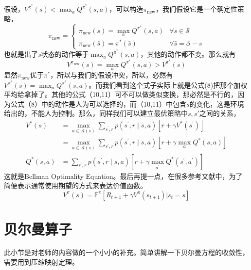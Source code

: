 \documentclass[a4paper]{article}
\begin{document}
假设，$V^{\pi^\ast}(s) < \max_a Q^{\pi^\ast}(s,a)$，可以构造$\pi_{\text{new}}$，我们假设它是一个确定性策略，
\begin{equation}
    \pi_{\text{new}} =
    \left\{
    \begin{array}{ll}
        \pi_{\text{new}}(s) = \max_a Q^{\pi^\ast}(s,a) & \forall s\in \mathcal{S}  \\
        \pi_{\text{new}}(\bar{s}) = \pi^\ast(\bar{s}) & \forall \bar{s} = \mathcal{S} - s
    \end{array}
    \right.
\end{equation}
也就是出了$s$状态的动作等于$\max_a Q^{\pi^\ast}(s,a)$，其他的动作都不变。那么就有
\begin{equation}
    V^{\pi_{\text{new}}}(s) = \max_a Q^{\pi^\ast}(s,a) > V^{\pi^\ast}(s)
\end{equation}
显然$\pi_{\text{new}}$优于$\pi^\ast$，所以与我们的假设冲突，所以，必然有$V^{\pi^\ast}(s) = \max_a Q^{\pi^\ast}(s,a)$。而我们看到这个式子实际上就是公式(8)把那个加权平均给拿掉了。其他的公式（10,11）可不可以做类似变换，那必然是不行的，因为公式（8）中的动作是人为可以选择的，而（10,11）中包含$s$的变化，这是环境给出的，不能人为控制。那么，同样我们可以建立最优策略中$s,s'$之间的关系，
\begin{equation}\begin{aligned}
V^{*}(s) &=\max _{a \in \mathcal{A}(s)} \sum_{s^{\prime}, r} p\left(s^{\prime}, r \mid s, a\right)\left[r+\gamma V^{*}\left(s^{\prime}\right)\right] \\
& = \max _{a \in \mathcal{A}(s)} \sum_{s^{\prime}, r} p\left(s^{\prime}, r \mid s, a\right)\left[r+\gamma \max_a Q^\ast(s,a)\right] \\
Q^{*}(s, a) &=\sum_{s^{\prime}, r} p\left(s^{\prime}, r \mid s, a\right)\left[r+\gamma \max _{a^{\prime}} Q^{*}\left(s^{\prime}, a^{\prime}\right)\right]
\end{aligned}\end{equation}
这就是Bellman Optimality Equation。最后再提一点，在很多参考文献中，为了简便表示通常使用期望的方式来表达价值函数。
\begin{equation}
    V^\pi(s) = \mathbb{E}^\pi\left[R_{t+1} + \gamma V^\pi(s_{t+1})|s_t=s\right]
\end{equation}


\section{贝尔曼算子}
此小节是对老师的内容做的一个小小的补充。简单讲解一下贝尔曼方程的收敛性，需要用到压缩映射定理。
\end{document}
